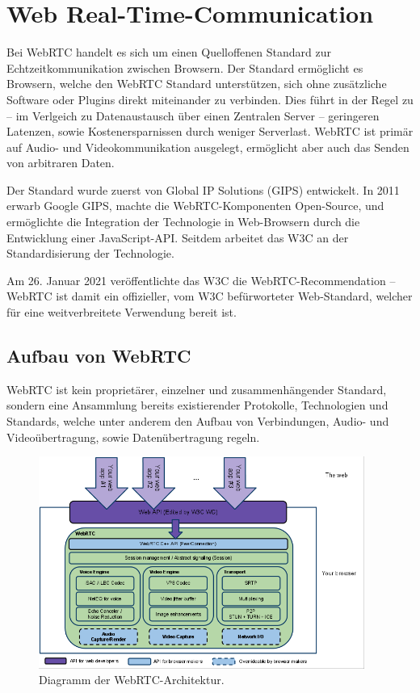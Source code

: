 \section{Web Real-Time-Communication}
Bei \ac{WebRTC} handelt es sich um einen Quelloffenen Standard zur Echtzeitkommunikation zwischen Browsern. Der Standard ermöglicht es Browsern, welche den \acs{WebRTC} Standard unterstützen, sich ohne zusätzliche Software oder Plugins direkt miteinander zu verbinden. Dies führt in der Regel zu -- im Verlgeich zu Datenaustausch über einen Zentralen Server -- geringeren Latenzen, sowie Kostenersparnissen durch weniger Serverlast. WebRTC ist primär auf Audio- und Videokommunikation ausgelegt, ermöglicht aber auch das Senden von arbitraren Daten.\par

Der Standard wurde zuerst von Global IP Solutions (GIPS) entwickelt. In 2011 erwarb Google GIPS, machte die \acs{WebRTC}-Komponenten Open-Source, und ermöglichte die Integration der Technologie in Web-Browsern durch die Entwicklung einer JavaScript-\acs{API}. Seitdem arbeitet das \acs{W3C} an der Standardisierung der Technologie.

Am 26. Januar 2021 veröffentlichte das \acs{W3C} die \acs{WebRTC}-Recommendation -- \acs{WebRTC} ist damit ein offizieller, vom \acs{W3C} befürworteter Web-Standard, welcher für eine weitverbreitete Verwendung bereit ist. 

\subsection{Aufbau von WebRTC}
WebRTC ist kein proprietärer, einzelner und zusammenhängender Standard, sondern eine Ansammlung bereits existierender Protokolle, Technologien und Standards, welche unter anderem den Aufbau von Verbindungen, Audio- und Videoübertragung, sowie Datenübertragung regeln.\par

\begin{figure}[h]
\centering
\includegraphics[width=0.95\textwidth]{bilder/webrtc-diagram.png}
\caption{Diagramm der WebRTC-Architektur.}
\label{fig:webrtcArchitecture}
\end{figure}


